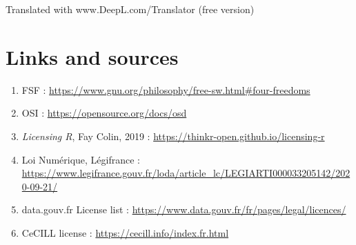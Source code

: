 \documentclass[12pt, colorinlistoftodos]{article}
\begin{document}
Translated with www.DeepL.com/Translator (free version)

\section{Links and sources}

\begin{enumerate}
    \item FSF : \url{https://www.gnu.org/philosophy/free-sw.html#four-freedoms}
    \item OSI : \url{https://opensource.org/docs/osd}
    \item \textit{Licensing R}, Fay Colin, 2019 : \url{https://thinkr-open.github.io/licensing-r}
    \item Loi Numérique, Légifrance : \url{https://www.legifrance.gouv.fr/loda/article_lc/LEGIARTI000033205142/2020-09-21/}
    \item data.gouv.fr License list : \url{https://www.data.gouv.fr/fr/pages/legal/licences/}
    \item CeCILL license : \url{https://cecill.info/index.fr.html}
\end{enumerate}
\end{document}
